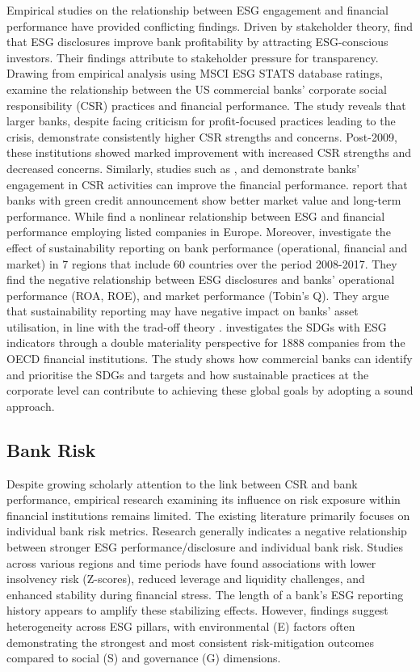 \documentclass[
  authoryear]{elsarticle}
\begin{document}
Empirical studies on the relationship between ESG engagement and
financial performance have provided conflicting findings. Driven by
stakeholder theory, \citet{WU2013} find that ESG disclosures improve
bank profitability by attracting ESG-conscious investors. Their findings
attribute to stakeholder pressure for transparency. Drawing from
empirical analysis using MSCI ESG STATS database ratings,
\citet{CORNETT2016} examine the relationship between the US commercial
banks' corporate social responsibility (CSR) practices and financial
performance. The study reveals that larger banks, despite facing
criticism for profit-focused practices leading to the crisis,
demonstrate consistently higher CSR strengths and concerns. Post-2009,
these institutions showed marked improvement with increased CSR
strengths and decreased concerns. Similarly, studies such as
\citet{CARNEVALE2014}, \citet{SHEN2016} and \citet{BUALLAY2021}
demonstrate banks' engagement in CSR activities can improve the
financial performance. \citet{TIAN2023} report that banks with green
credit announcement show better market value and long-term performance.
While \citet{FERRERO2016} find a nonlinear relationship between ESG and
financial performance employing listed companies in Europe. Moreover,
\citet{BUALLAY2023} investigate the effect of sustainability reporting
on bank performance (operational, financial and market) in 7 regions
that include 60 countries over the period 2008-2017. They find the
negative relationship between ESG disclosures and banks' operational
performance (ROA, ROE), and market performance (Tobin's Q). They argue
that sustainability reporting may have negative impact on banks' asset
utilisation, in line with the trad-off theory \citep[see][]{LEE2009}.
\citet{ARAS2024} investigates the SDGs with ESG indicators through a
double materiality perspective for 1888 companies from the OECD
financial institutions. The study shows how commercial banks can
identify and prioritise the SDGs and targets and how sustainable
practices at the corporate level can contribute to achieving these
global goals by adopting a sound approach.

\subsection{Bank Risk}\label{bank-risk}

Despite growing scholarly attention to the link between CSR and bank
performance, empirical research examining its influence on risk exposure
within financial institutions remains limited. The existing literature
primarily focuses on individual bank risk metrics. Research generally
indicates a negative relationship between stronger ESG
performance/disclosure and individual bank risk. Studies across various
regions and time periods have found associations with lower insolvency
risk (Z-scores), reduced leverage and liquidity challenges, and enhanced
stability during financial stress. The length of a bank's ESG reporting
history appears to amplify these stabilizing effects. However, findings
suggest heterogeneity across ESG pillars, with environmental (E) factors
often demonstrating the strongest and most consistent risk-mitigation
outcomes compared to social (S) and governance (G) dimensions.
\end{document}
